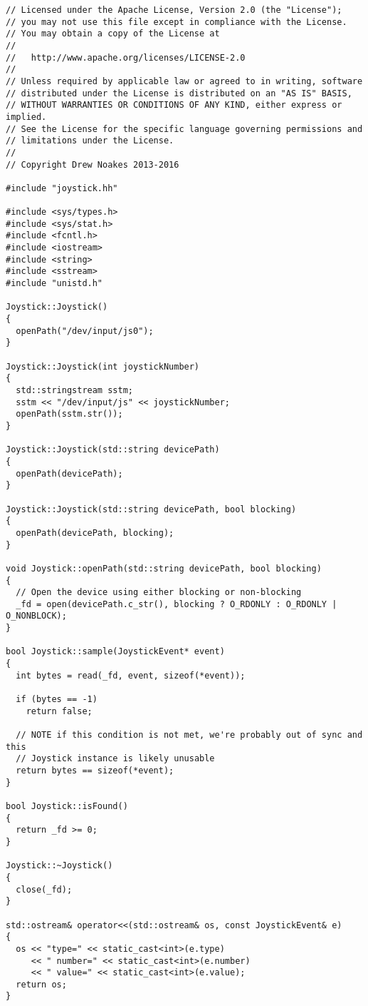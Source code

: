 \documentclass[a4paper,11pt]{article}
\begin{document}
\linespread{0.8}
\begin{lstlisting}
// Licensed under the Apache License, Version 2.0 (the "License");
// you may not use this file except in compliance with the License.
// You may obtain a copy of the License at
//
//   http://www.apache.org/licenses/LICENSE-2.0
//
// Unless required by applicable law or agreed to in writing, software
// distributed under the License is distributed on an "AS IS" BASIS,
// WITHOUT WARRANTIES OR CONDITIONS OF ANY KIND, either express or implied.
// See the License for the specific language governing permissions and
// limitations under the License.
//
// Copyright Drew Noakes 2013-2016

#include "joystick.hh"

#include <sys/types.h>
#include <sys/stat.h>
#include <fcntl.h>
#include <iostream>
#include <string>
#include <sstream>
#include "unistd.h"

Joystick::Joystick()
{
  openPath("/dev/input/js0");
}

Joystick::Joystick(int joystickNumber)
{
  std::stringstream sstm;
  sstm << "/dev/input/js" << joystickNumber;
  openPath(sstm.str());
}

Joystick::Joystick(std::string devicePath)
{
  openPath(devicePath);
}

Joystick::Joystick(std::string devicePath, bool blocking)
{
  openPath(devicePath, blocking);
}

void Joystick::openPath(std::string devicePath, bool blocking)
{
  // Open the device using either blocking or non-blocking
  _fd = open(devicePath.c_str(), blocking ? O_RDONLY : O_RDONLY | O_NONBLOCK);
}

bool Joystick::sample(JoystickEvent* event)
{
  int bytes = read(_fd, event, sizeof(*event)); 

  if (bytes == -1)
    return false;

  // NOTE if this condition is not met, we're probably out of sync and this
  // Joystick instance is likely unusable
  return bytes == sizeof(*event);
}

bool Joystick::isFound()
{
  return _fd >= 0;
}

Joystick::~Joystick()
{
  close(_fd);
}

std::ostream& operator<<(std::ostream& os, const JoystickEvent& e)
{
  os << "type=" << static_cast<int>(e.type)
     << " number=" << static_cast<int>(e.number)
     << " value=" << static_cast<int>(e.value);
  return os;
}
\end{lstlisting}
\end{document}
